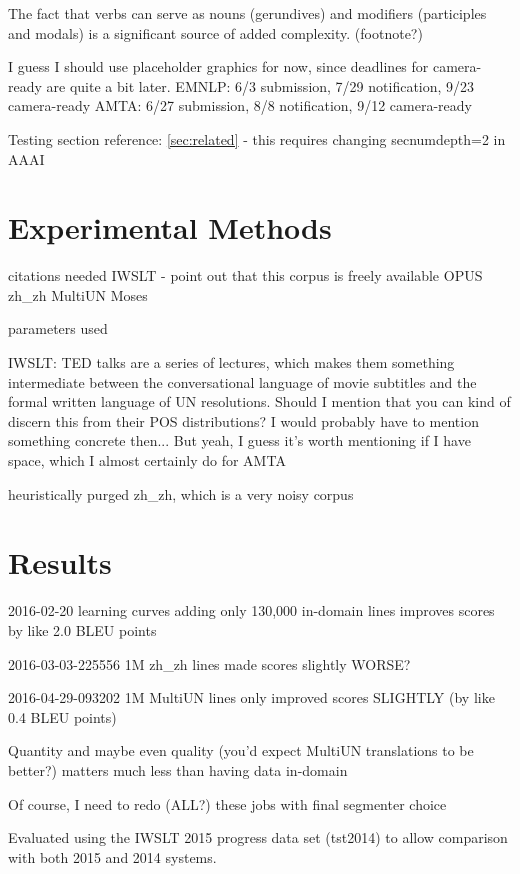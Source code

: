 The fact that verbs can serve as nouns (gerundives) and modifiers (participles and modals) is a significant source of added complexity. (footnote?)


I guess I should use placeholder graphics for now, since deadlines for camera-ready are quite a bit later.
EMNLP: 6/3 submission, 7/29 notification, 9/23 camera-ready
AMTA: 6/27 submission, 8/8 notification, 9/12 camera-ready

Testing section reference: \ref{sec:related} - this requires changing secnumdepth=2 in AAAI

\section{Experimental Methods}

citations needed
IWSLT - point out that this corpus is freely available
OPUS zh\_zh
MultiUN
Moses

parameters used

IWSLT: TED talks are a series of lectures, which makes them something intermediate between the conversational language of movie subtitles and the formal written language of UN resolutions.
Should I mention that you can kind of discern this from their POS distributions? I would probably have to mention something concrete then... But yeah, I guess it's worth mentioning if I have space, which I almost certainly do for AMTA

heuristically purged zh\_zh, which is a very noisy corpus

\section{Results}

2016-02-20 learning curves adding only 130,000 in-domain lines improves scores by like 2.0 BLEU points

2016-03-03-225556 1M zh\_zh lines made scores slightly WORSE?

2016-04-29-093202 1M MultiUN lines only improved scores SLIGHTLY (by like 0.4 BLEU points)

Quantity and maybe even quality (you'd expect MultiUN translations to be better?) matters much less than having data in-domain

Of course, I need to redo (ALL?) these jobs with final segmenter choice

Evaluated using the IWSLT 2015 progress data set (tst2014) to allow comparison with both 2015 and 2014 systems.


